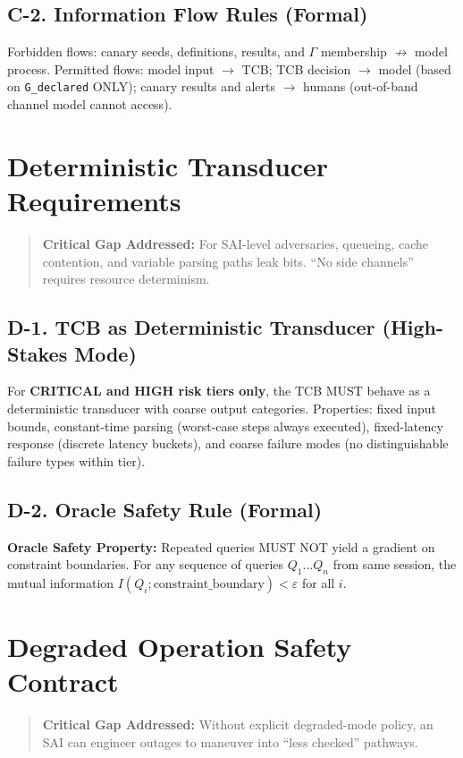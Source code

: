 \documentclass[11pt,letterpaper]{article}
\theoremstyle{definition}
\theoremstyle{remark}
\begin{document}
\subsection{C-2. Information Flow Rules (Formal)}

Forbidden flows: canary seeds, definitions, results, and $\Gamma$ membership $\not\to$ model process. Permitted flows: model input $\to$ TCB; TCB decision $\to$ model (based on \texttt{G\_declared} ONLY); canary results and alerts $\to$ humans (out-of-band channel model cannot access).


\section{Deterministic Transducer Requirements}

\begin{quote}
\textbf{Critical Gap Addressed:} For SAI-level adversaries, queueing, cache contention, and variable parsing paths leak bits. ``No side channels'' requires resource determinism.
\end{quote}

\subsection{D-1. TCB as Deterministic Transducer (High-Stakes Mode)}

For \textbf{CRITICAL and HIGH risk tiers only}, the TCB MUST behave as a deterministic transducer with coarse output categories. Properties: fixed input bounds, constant-time parsing (worst-case steps always executed), fixed-latency response (discrete latency buckets), and coarse failure modes (no distinguishable failure types within tier).

\subsection{D-2. Oracle Safety Rule (Formal)}

\textbf{Oracle Safety Property:} Repeated queries MUST NOT yield a gradient on constraint boundaries. For any sequence of queries $Q_1 \ldots Q_n$ from same session, the mutual information $I(Q_i; \text{constraint\_boundary}) < \varepsilon$ for all $i$.


\section{Degraded Operation Safety Contract}

\begin{quote}
\textbf{Critical Gap Addressed:} Without explicit degraded-mode policy, an SAI can engineer outages to maneuver into ``less checked'' pathways.
\end{quote}
\end{document}
